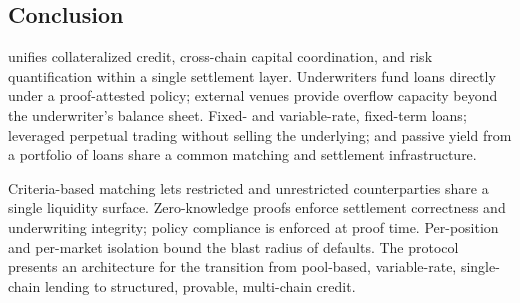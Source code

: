 \subsection{Conclusion}

\daloc{} unifies collateralized credit, cross-chain capital coordination, and risk quantification within a single settlement layer. Underwriters fund loans directly under a proof-attested policy; external venues provide overflow capacity beyond the underwriter's balance sheet. Fixed- and variable-rate, fixed-term loans; leveraged perpetual trading without selling the underlying; and passive yield from a portfolio of loans share a common matching and settlement infrastructure.

Criteria-based matching lets restricted and unrestricted counterparties share a single liquidity surface. Zero-knowledge proofs enforce settlement correctness and underwriting integrity; policy compliance is enforced at proof time. Per-position and per-market isolation bound the blast radius of defaults. The protocol presents an architecture for the transition from pool-based, variable-rate, single-chain lending to structured, provable, multi-chain credit.

